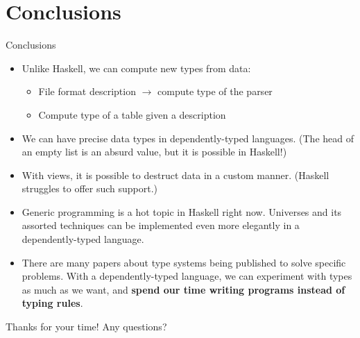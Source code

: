 \documentclass[10pt]{beamer}
\begin{document}
\section{Conclusions}
\begin{frame}[fragile]{Conclusions}

\begin{itemize}
\item Unlike Haskell, we can compute new types from data:
	\begin{itemize}
	\item File format description $\rightarrow$ compute type of the parser
	\item Compute type of a table given a description
	\end{itemize}
\item We can have precise data types in dependently-typed languages. (The head of an empty list is an absurd value, but it is possible in Haskell!)
\item With views, it is possible to destruct data in a custom manner. (Haskell struggles to offer such support.)
\item Generic programming is a hot topic in Haskell right now. Universes and its assorted techniques can be implemented even more elegantly in a dependently-typed language.
\item There are many papers about type systems being published to solve specific problems. With a dependently-typed language, we can experiment with types as much as we want, and \textbf{spend our time writing programs instead of typing rules}.
\end{itemize}

\end{frame}

\begin{frame}[fragile]

\begin{center}
Thanks for your time! Any questions?
\end{center}

\end{frame}
\end{document}
